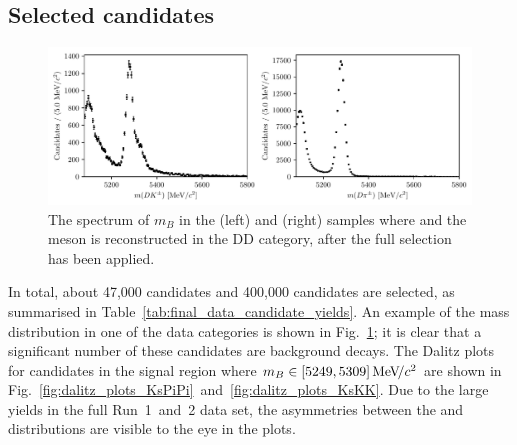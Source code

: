 \subsection{Selected candidates} %
\label{sub:selected_candidates}



\begin{figure}[tb]
    \centering
    \includegraphics[width=\columnwidth]{figures/analysis/pretty_data_d2kspp_DD.pdf}
    \caption{The spectrum of $m_B$ in the (left) \BtoDK and (right) \BtoDpi samples where \DtoKspipi and the \KS meson is reconstructed in the DD category, after the full selection has been applied.}
    \label{fig:data_spectrum}
\end{figure}

In total, about 47,000 \BtoDK candidates and 400,000 \BtoDpi candidates are selected, as summarised in Table~\ref{tab:final_data_candidate_yields}. An example of the \B mass distribution in one of the data categories is shown in Fig.~\ref{fig:data_spectrum}; it is clear that a significant number of these candidates are background decays. The Dalitz plots for candidates in the signal region where $m_B\in[5249, 5309]\text{\,Me\kern -0.1em V\!/}c^2$ are shown in Fig.~\ref{fig:dalitz_plots_KsPiPi}~and~\ref{fig:dalitz_plots_KsKK}. Due to the large yields in the full Run~1~and~2 \lhcb data set, the asymmetries between the \Bp and \Bm distributions are visible to the eye in the \BtoDK plots.


